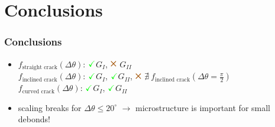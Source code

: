 \documentclass[first,firstsupp,lastsupp,last,hyperref,table]{ETHclass}
\newcommand{\Cross}{$\mathbin{\tikz [x=1.4ex,y=1.4ex,line width=.2ex, red] \draw (0,0) -- (1,1) (0,1) -- (1,0);}$}%
\newcommand{\Checkmark}{$\color{green}\mathbf{\checkmark}$}
\begin{document}
\section{Conclusions}

\begin{frame}
\frametitle{Conclusions}
\vspace{-0.5cm}
\centering
\begin{itemize}[label=]
\item $f_{\text{straight crack}}\left(\Delta\theta\right)$: \Checkmark $G_{I}$, \textcolor{red}{\Cross} $G_{II}$\\[10pt]
$f_{\text{inclined crack}}\left(\Delta\theta\right)$: \Checkmark $G_{I}$, \Checkmark $G_{II}$, \textcolor{red}{\Cross} $\nexists\ f_{\text{inclined crack}}\left(\Delta\theta=\frac{\pi}{2}\right)$\\[10pt]
$f_{\text{curved crack}}\left(\Delta\theta\right)$: \Checkmark $G_{I}$, \Checkmark $G_{II}$\\[20pt]
\item scaling breaks for $\Delta\theta\leq20^{\circ}$ $\rightarrow$ microstructure is important for small debonds!
\end{itemize}
\end{frame}

\begin{frame}[plain]
\frametitle{}
\end{frame}
\end{document}
